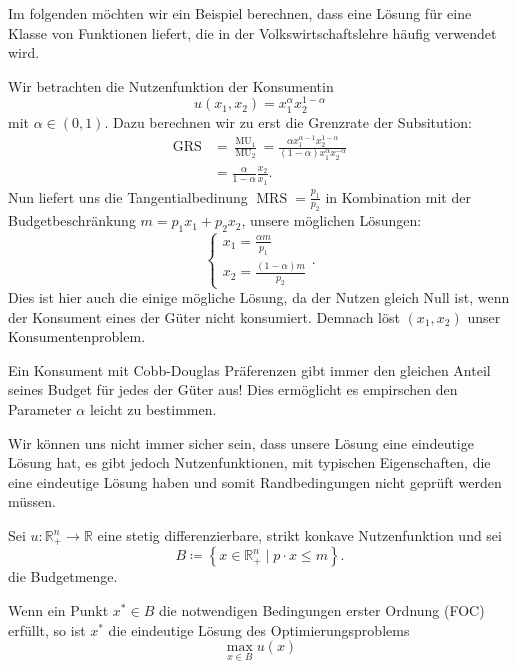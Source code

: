 \noindent Im folgenden möchten wir ein Beispiel berechnen, dass eine Lösung für eine Klasse von Funktionen liefert, die in der Volkswirtschaftslehre häufig verwendet wird.
\begin{example}
	Wir betrachten die Nutzenfunktion der Konsumentin
	\[
		u(x_1,x_2) = x_1^{\alpha} x_2^{1-\alpha}
	\]
	mit $\alpha \in (0,1)$.
	Dazu berechnen wir zu erst die Grenzrate der Subsitution:
	\begin{align*}
		\operatorname{GRS} & = \frac{\operatorname{MU}_1}{\operatorname{MU}_2} = \frac{\alpha x_1^{\alpha-1}x_2^{1-\alpha}}{(1-\alpha)x_1^{\alpha} x_2^{-\alpha}} \\
		                   & = \frac{\alpha}{1-\alpha} \frac{x_{2}}{x_1}
		.\end{align*}
	Nun liefert uns die Tangentialbedinung $\operatorname{MRS} = \frac{p_1}{p_2}$ in Kombination mit der Budgetbeschränkung $m= p_1x_1+p_2x_2$, unsere möglichen Lösungen:
	\[
		\begin{cases}
			x_1 = \frac{\alpha m }{p_1} \\
			x_2 = \frac{(1-\alpha) m}{p_2}
		\end{cases}
		.\]
	Dies ist hier auch die einige mögliche Lösung, da der Nutzen gleich Null ist, wenn der Konsument eines der Güter
	nicht konsumiert.
	Demnach löst $(x_1,x_2)$ unser Konsumentenproblem.
\end{example}
\begin{remark}
	Ein Konsument mit Cobb-Douglas Präferenzen gibt immer den gleichen
	Anteil seines Budget für jedes der Güter aus! Dies ermöglicht es empirschen den Parameter $\alpha$ leicht zu bestimmen.
\end{remark}
Wir können uns nicht immer sicher sein, dass unsere Lösung eine eindeutige Lösung hat, es gibt jedoch Nutzenfunktionen, mit typischen Eigenschaften, die eine eindeutige Lösung haben und somit Randbedingungen nicht geprüft werden müssen.

\begin{lemma}
	Sei \( u: \mathbb{R}^n_+ \to \mathbb{R} \) eine stetig differenzierbare, strikt konkave Nutzenfunktion und sei
	\[
		B \coloneqq \left\{ x \in \mathbb{R}^n_+ \mid p \cdot x \leq m \right\}
		.\]
	die Budgetmenge.

	Wenn ein Punkt \( x^* \in B \) die notwendigen Bedingungen erster Ordnung (FOC) erfüllt, so ist \( x^* \) die eindeutige Lösung des Optimierungsproblems
	\[
		\max_{x \in B} u(x)
	\]
\end{lemma}

